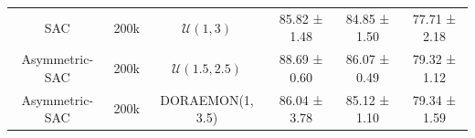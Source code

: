 \begin{table}
{\begin{tabular}{cccccc}
\rowcolor[HTML]{EFEFEF} 
SAC                & 200k                                                                   & \( \mathcal{U}(1, 3) \)                                                  & 85.82 ± 1.48                                                                            & 84.85 ± 1.50                                                                 & 77.71 ± 2.18                                                                          \\
\rowcolor[HTML]{FFFFFF} 
Asymmetric-SAC     & 200k                                                                   & \( \mathcal{U}(1.5, 2.5) \)                                              & 88.69 ± 0.60                                                                            & 86.07 ± 0.49                                                                 & 79.32 ± 1.12                                                                          \\
\rowcolor[HTML]{EFEFEF} 
Asymmetric-SAC     & 200k                                                                   & DORAEMON(1, 3.5)                                                         & 86.04 ± 3.78                                                                            & 85.12 ± 1.10                                                                 & 79.34 ± 1.59                                                                         
\end{tabular}%
}
\end{table}


